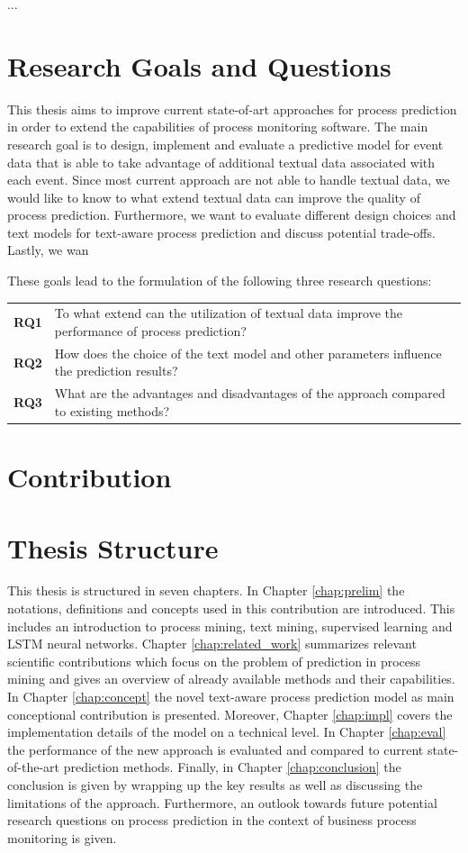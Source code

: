 $\dots$

\section{Research Goals and Questions}

This thesis aims to improve current state-of-art approaches for process prediction in order to extend the capabilities of process monitoring software.
The main research goal is to design, implement and evaluate a predictive model for event data that is able to take advantage of additional textual data associated with each event.
Since most current approach are not able to handle textual data, we would like to know to what extend textual data can improve the quality of process prediction.
Furthermore, we want to evaluate different design choices and text models for text-aware process prediction and discuss potential trade-offs.
Lastly, we wan

These goals lead to the formulation of the following three research questions:

\begin{tabularx}{\textwidth}{lX}
	\textbf{RQ1} & To what extend can the utilization of textual data improve the performance of process prediction? \\
	\textbf{RQ2} & How does the choice of the text model and other parameters influence the prediction results?\\
	\textbf{RQ3} & What are the advantages and disadvantages of the approach compared to existing methods?
\end{tabularx}

\section{Contribution}



\section{Thesis Structure}

This thesis is structured in seven chapters.
In Chapter \ref{chap:prelim} the notations, definitions and concepts used in this contribution are introduced.
This includes an introduction to process mining, text mining, supervised learning and LSTM neural networks.
Chapter \ref{chap:related_work} summarizes relevant scientific contributions which focus on the problem of prediction in process mining and gives an overview of already available methods and their capabilities.
In Chapter \ref{chap:concept} the novel text-aware process prediction model as main conceptional contribution is presented.
Moreover, Chapter \ref{chap:impl} covers the implementation details of the model on a technical level.
In Chapter \ref{chap:eval} the performance of the new approach is evaluated and compared to current state-of-the-art prediction methods.
Finally, in Chapter \ref{chap:conclusion} the conclusion is given by wrapping up the key results as well as discussing the limitations of the approach.
Furthermore, an outlook towards future potential research questions on process prediction in the context of business process monitoring is given.